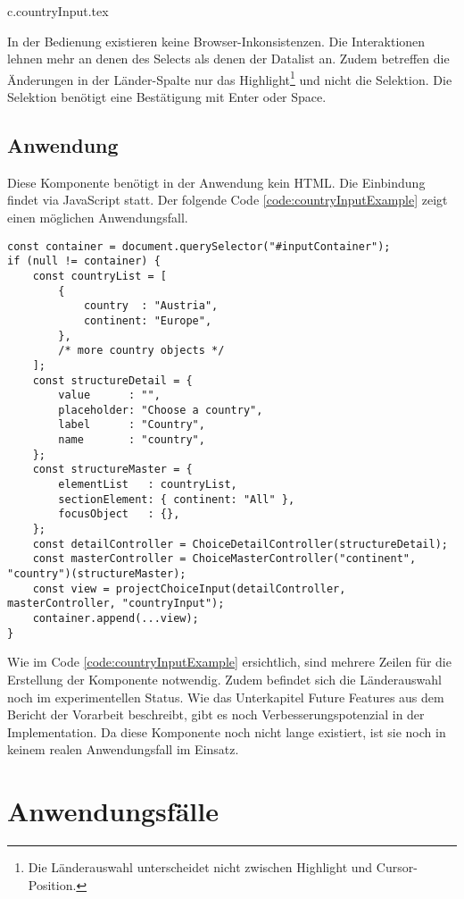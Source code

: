 {c.countryInput.tex}

In der Bedienung existieren keine Browser-Inkonsistenzen. 
Die Interaktionen lehnen mehr an denen des Selects als denen der Datalist an. 
Zudem betreffen die Änderungen in der Länder-Spalte nur das Highlight\footnote{
    Die Länderauswahl unterscheidet nicht zwischen Highlight und Cursor-Position. 
} und nicht die Selektion. 
Die Selektion benötigt eine Bestätigung mit Enter oder Space. 


\subsection{Anwendung}
\label{sec:countryChoiceUse}

Diese Komponente benötigt in der Anwendung kein HTML. 
Die Einbindung findet via JavaScript statt. 
Der folgende Code \ref{code:countryInputExample} zeigt einen möglichen Anwendungsfall. 

\begin{lstlisting}[style = htmlcssjs, caption = Länderauswahl Beispiel, label = code:countryInputExample]
const container = document.querySelector("#inputContainer");
if (null != container) {
    const countryList = [
        {
            country  : "Austria",
            continent: "Europe",
        },
        /* more country objects */
    ];
    const structureDetail = {
        value      : "",
        placeholder: "Choose a country",
        label      : "Country",
        name       : "country",
    };
    const structureMaster = {
        elementList   : countryList,
        sectionElement: { continent: "All" },
        focusObject   : {},
    };
    const detailController = ChoiceDetailController(structureDetail);
    const masterController = ChoiceMasterController("continent", "country")(structureMaster);
    const view = projectChoiceInput(detailController, masterController, "countryInput");
    container.append(...view);
}
\end{lstlisting}

Wie im Code \ref{code:countryInputExample} ersichtlich, sind mehrere Zeilen für die Erstellung der Komponente notwendig. 
Zudem befindet sich die Länderauswahl noch im experimentellen Status. 
Wie das Unterkapitel Future Features aus dem Bericht\citemarktext{
    [\cite{ip5}]
} der Vorarbeit beschreibt, gibt es noch Verbesserungspotenzial in der Implementation. 
Da diese Komponente noch nicht lange existiert, ist sie noch in keinem realen Anwendungsfall im Einsatz. 


\section{Anwendungsfälle}
\label{sec:useCases}

